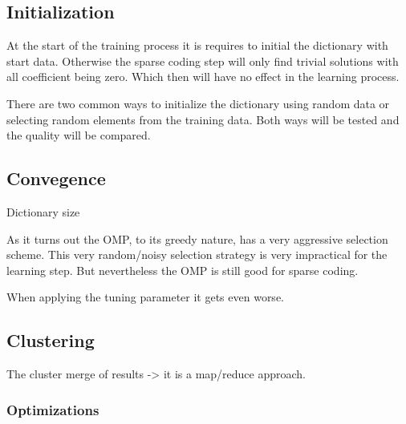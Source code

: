 \subsection{Initialization}
At the start of the training process it is requires to initial the
dictionary with start data. Otherwise the sparse coding step will only find
trivial solutions with all coefficient being zero. Which then will have no
effect in the learning process.

There are two common ways to initialize the dictionary using random data or
selecting random elements from the training data. Both ways will be tested and 
the quality will be compared.




\subsection{Convegence}

Dictionary size 

As it turns out the OMP, to its greedy nature, has a very aggressive selection
scheme. This very random/noisy selection strategy is very impractical
for the \trainDL learning step. But nevertheless the OMP is still good for
sparse coding. 

When applying the tuning parameter it gets even worse. 

\subsection{Clustering}

The cluster merge of results -> 
it is a map/reduce approach. 


\subsubsection*{Optimizations}

